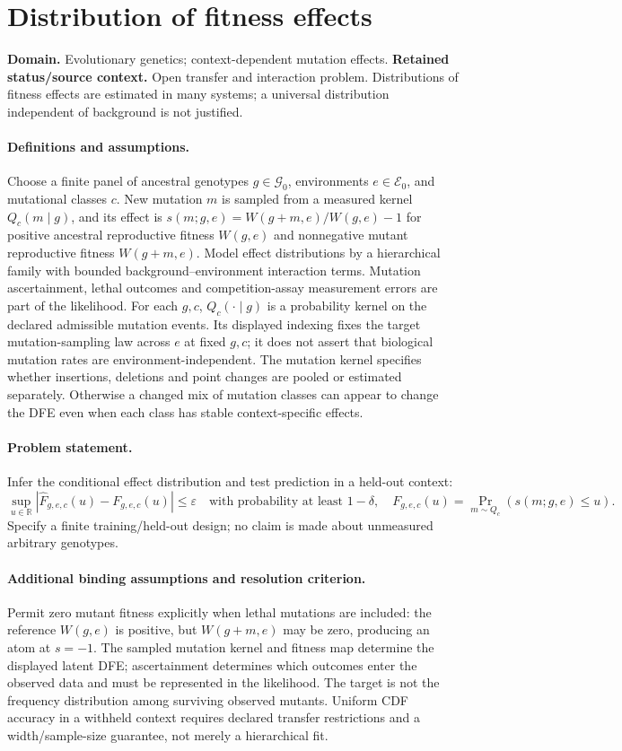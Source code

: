 \documentclass[11pt]{article}
\begin{document}
\section*{Distribution of fitness effects}
\label{prob:168}
\label{rank:237}
\par\smallskip

\noindent\textbf{Domain.} Evolutionary genetics; context-dependent mutation effects. \quad \textbf{Retained status/source context.} Open transfer and interaction problem. Distributions of fitness effects are estimated in many systems; a universal distribution independent of background is not justified.
\paragraph{Definitions and assumptions.} Choose a finite panel of ancestral genotypes $g\in\mathcal G_0$, environments $e\in\mathcal E_0$, and mutational classes $c$. New mutation $m$ is sampled from a measured kernel $Q_c(m\mid g)$, and its effect is $s(m;g,e)=W(g+m,e)/W(g,e)-1$ for positive ancestral reproductive fitness $W(g,e)$ and nonnegative mutant reproductive fitness $W(g+m,e)$. Model effect distributions by a hierarchical family with bounded background--environment interaction terms. Mutation ascertainment, lethal outcomes and competition-assay measurement errors are part of the likelihood. For each $g,c$, $Q_c(\cdot\mid g)$ is a probability kernel on the declared admissible mutation events. Its displayed indexing fixes the target mutation-sampling law across $e$ at fixed $g,c$; it does not assert that biological mutation rates are environment-independent. The mutation kernel specifies whether insertions, deletions and point changes are pooled or estimated separately. Otherwise a changed mix of mutation classes can appear to change the DFE even when each class has stable context-specific effects.
\paragraph{Problem statement.} Infer the conditional effect distribution and test prediction in a held-out context:
\[
 \sup_{u\in\mathbb{R}}
 |\widehat F_{g,e,c}(u)-F_{g,e,c}(u)|\le\varepsilon
 \quad\text{with probability at least }1-\delta,
 \quad F_{g,e,c}(u)=\Pr_{m\sim Q_c}(s(m;g,e)\le u).
\]
Specify a finite training/held-out design; no claim is made about unmeasured arbitrary genotypes.
\paragraph{Additional binding assumptions and resolution criterion.} Permit zero mutant fitness explicitly when lethal mutations are included: the reference $W(g,e)$ is positive, but $W(g+m,e)$ may be zero, producing an atom at $s=-1$. The sampled mutation kernel and fitness map determine the displayed latent DFE; ascertainment determines which outcomes enter the observed data and must be represented in the likelihood. The target is not the frequency distribution among surviving observed mutants. Uniform CDF accuracy in a withheld context requires declared transfer restrictions and a width/sample-size guarantee, not merely a hierarchical fit.
\end{document}
